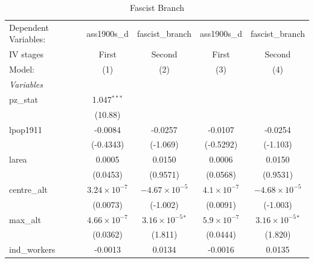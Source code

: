 
\begin{table}[htbp]
   \caption{Fascist Branch}
   \centering
   \begin{tabular}{lcccc}
      \tabularnewline \midrule \midrule
      Dependent Variables:             & ass1900s\_d           & fascist\_branch             & ass1900s\_d          & fascist\_branch\\   
      IV stages                        & First                 & Second                      & First                & Second \\   
      Model:                           & (1)                   & (2)                         & (3)                  & (4)\\  
      \midrule
      \emph{Variables}\\
      pz\_stat                         & 1.047$^{***}$         &                             &                      &   \\   
                                       & (10.88)               &                             &                      &   \\   
      lpop1911                         & -0.0084               & -0.0257                     & -0.0107              & -0.0254\\   
                                       & (-0.4343)             & (-1.069)                    & (-0.5292)            & (-1.103)\\   
      larea                            & 0.0005                & 0.0150                      & 0.0006               & 0.0150\\   
                                       & (0.0453)              & (0.9571)                    & (0.0568)             & (0.9531)\\   
      centre\_alt                      & $3.24\times 10^{-7}$  & $-4.67\times 10^{-5}$       & $4.1\times 10^{-7}$  & $-4.68\times 10^{-5}$\\    
                                       & (0.0073)              & (-1.002)                    & (0.0091)             & (-1.003)\\   
      max\_alt                         & $4.66\times 10^{-7}$  & $3.16\times 10^{-5}$$^{*}$  & $5.9\times 10^{-7}$  & $3.16\times 10^{-5}$$^{*}$\\    
                                       & (0.0362)              & (1.811)                     & (0.0444)             & (1.820)\\   
      ind\_workers                     & -0.0013               & 0.0134                      & -0.0016              & 0.0135\\   

\end{tabular}
\end{table}
